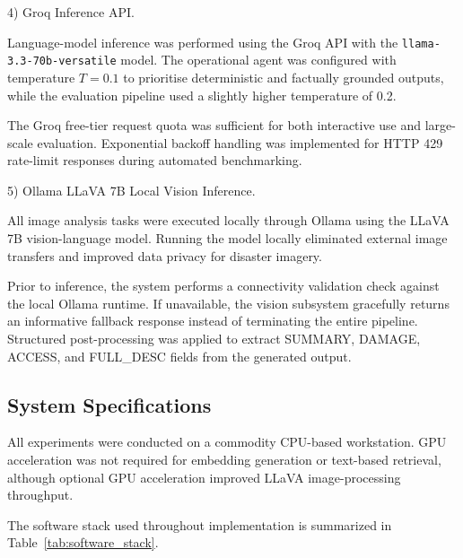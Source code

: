 \documentclass[conference]{IEEEtran}
\begin{document}
4) Groq Inference API.

Language-model inference was performed using the Groq API with the
\texttt{llama-3.3-70b-versatile} model. The operational agent was configured with
temperature \(T = 0.1\) to prioritise deterministic and factually grounded outputs,
while the evaluation pipeline used a slightly higher temperature of 0.2.

The Groq free-tier request quota was sufficient for both interactive use and
large-scale evaluation. Exponential backoff handling was implemented for HTTP 429
rate-limit responses during automated benchmarking.

5) Ollama LLaVA 7B Local Vision Inference.

All image analysis tasks were executed locally through Ollama using the LLaVA 7B
vision-language model. Running the model locally eliminated external image transfers
and improved data privacy for disaster imagery.

Prior to inference, the system performs a connectivity validation check against the
local Ollama runtime. If unavailable, the vision subsystem gracefully returns an
informative fallback response instead of terminating the entire pipeline. Structured
post-processing was applied to extract SUMMARY, DAMAGE, ACCESS, and FULL\_DESC fields
from the generated output.

\subsection{System Specifications}

All experiments were conducted on a commodity CPU-based workstation. GPU acceleration
was not required for embedding generation or text-based retrieval, although optional
GPU acceleration improved LLaVA image-processing throughput.

The software stack used throughout implementation is summarized in
Table~\ref{tab:software_stack}.
\end{document}

